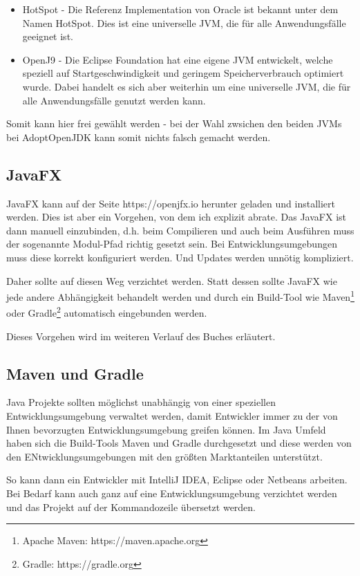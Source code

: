 \begin{itemize}
\item HotSpot - Die Referenz Implementation von Oracle ist bekannt unter dem Namen HotSpot. Dies ist eine universelle JVM, die für alle Anwendungsfälle geeignet ist.
\item OpenJ9 - Die Eclipse Foundation hat eine eigene JVM entwickelt, welche speziell auf Startgeschwindigkeit und geringem Speicherverbrauch optimiert wurde. Dabei handelt es sich aber weiterhin um eine universelle JVM, die für alle Anwendungsfälle genutzt werden kann.
\end{itemize}

Somit kann hier frei gewählt werden - bei der Wahl zwsichen den beiden JVMs bei AdoptOpenJDK kann somit nichts falsch gemacht werden.

\subsection{JavaFX}
JavaFX kann auf der Seite https://openjfx.io herunter geladen und installiert werden. Dies ist aber ein Vorgehen, von dem ich explizit abrate. Das JavaFX ist dann manuell einzubinden, d.h. beim Compilieren und auch beim Ausführen muss der sogenannte Modul-Pfad richtig gesetzt sein. Bei Entwicklungsumgebungen muss diese korrekt konfiguriert werden. Und Updates werden unnötig kompliziert.

Daher sollte auf diesen Weg verzichtet werden. Statt dessen sollte JavaFX wie jede andere Abhängigkeit behandelt werden und durch ein Build-Tool wie Maven\footnote{Apache Maven: https://maven.apache.org} oder Gradle\footnote{Gradle: https://gradle.org} automatisch eingebunden werden.

Dieses Vorgehen wird im weiteren Verlauf des Buches erläutert.

\subsection{Maven und Gradle}

Java Projekte sollten möglichst unabhängig von einer speziellen Entwicklungsumgebung verwaltet werden, damit Entwickler immer zu der von Ihnen bevorzugten Entwicklungsumgebung greifen können. Im Java Umfeld haben sich die Build-Tools Maven und Gradle durchgesetzt und diese werden von den ENtwicklungsumgebungen mit den größten Marktanteilen unterstützt.

So kann dann ein Entwickler mit IntelliJ IDEA, Eclipse oder Netbeans arbeiten. Bei Bedarf kann auch ganz auf eine Entwicklungsumgebung verzichtet werden und das Projekt auf der Kommandozeile übersetzt werden.

